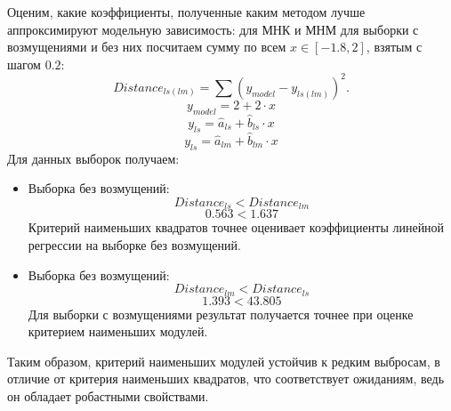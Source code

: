 \documentclass[../body.tex]{subfiles}
\begin{document}
	Оценим, какие коэффициенты, полученные каким методом лучше аппроксимируют модельную зависимость: для МНК и МНМ для выборки с возмущениями и без них посчитаем сумму по всем $x \in [-1.8, 2]$, взятым с шагом $0.2$: $$Distance_{ls(lm)} = \sum{(y_{model} - y_{ls(lm)})^2}.$$
	$$y_{model} = 2 + 2 \cdot x$$
	$$y_{ls} = \hat{a}_{ls} + \hat{b}_{ls} \cdot x$$
	$$y_{ls} = \hat{a}_{lm} + \hat{b}_{lm} \cdot x$$
	Для данных выборок получаем:
	\begin{itemize}
		 \item Выборка без возмущений: $$Distance_{ls} < Distance_{lm}$$ $$0.563  <  1.637$$
		 Критерий наименьших квадратов точнее оценивает коэффициенты линейной регрессии на выборке без возмущений. 
		 \item Выборка без возмущений: $$Distance_{lm} < Distance_{ls}$$ $$1.393  <  43.805$$
		 Для выборки с возмущениями результат получается точнее при оценке критерием наименьших модулей.
	\end{itemize}
	Таким образом, критерий наименьших модулей устойчив к редким выбросам, в отличие от критерия наименьших квадратов, что соответствует ожиданиям, ведь он обладает робастными свойствами.
\end{document}
